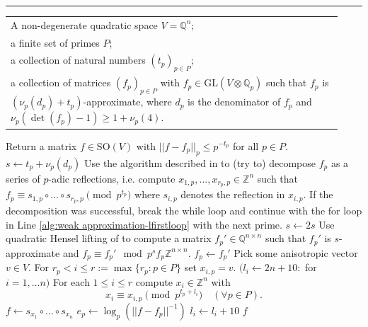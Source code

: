 \documentclass[11pt,letterpaper]{amsart}
\newcommand{\QQ}{\mathbb{Q}}
\newcommand{\ZZ}{\mathbb{Z}}
\theoremstyle{definition}
\theoremstyle{remark}
\begin{document}
\begingroup
{}\label{alg:weak approximation}
\endgroup
\hrule
\begin{algorithmic}[1]
\REQUIRE \begin{tabular}[t]{@{\textbullet\hspace{0.5em}} p{0.928\linewidth} @{}}
A non-degenerate quadratic space $V=\QQ^n$; \\
a finite set of primes $P$;\\
a collection of natural numbers $(t_p)_{p \in P}$;\\
a collection of matrices $(f_p)_{p \in P}$ with $f_p\in \mathrm{GL}(V \otimes \QQ_p)$ 
such that $f_p$ is $(\nu_p(d_p)+t_p)$-approximate, where $d_p$ is the denominator of $f_p$ and $\nu_p(\det(f_p)-1)\geq 1+\nu_p(4)$. 
\end{tabular}
\ENSURE Return a matrix $f \in \mathrm{SO}(V)$ with $||f - f_p||_p \leq p^{-t_p}$ for all $p \in P$.
\label{alg:weak approximation-lfirstloop}
  \STATE $s \gets t_p+\nu_p(d_p)$
  \STATE Use the algorithm described in \cite[Lemma 5.8]{shimada.connected.components} to (try to) decompose $f_p$ as a series of $p$-adic reflections, i.e. compute $x_{1,p},\dots ,x_{r_p,p} \in \ZZ^n$ such that $f_p \equiv s_{1,p} \circ \dots \circ s_{r_p,p} \pmod{ p^{t_p}}$ where $s_{i,p}$ denotes the reflection in $x_{i,p}$. \label{alg:weak approximation-lshimada} If the decomposition was successful, break the while loop and continue with the for loop in Line \ref{alg:weak approximation-lfirstloop} with the next prime. 
  \STATE $s \gets 2s$
  \STATE Use quadratic Hensel lifting of \cite[Algorithm 3]{brandhorst.veniani.hensel-lifting} to compute a matrix $f_p' \in \QQ^{n \times n}$ such that $f_p'$ is $s$-approximate and $f_p \equiv f_p' \mod p^s f_p \ZZ^{n \times n}$.  
  \STATE $f_p \gets f_p'$
  \ENDWHILE
\ENDFOR
\STATE Pick some anisotropic vector $v \in V$.
\STATE For $r_p<i\leq r:=\max\{r_p : p \in P\}$ set $x_{i,p}=v$. \label{alg:weak-approximation.padding}
\STATE $(l_i \gets 2n+10 \colon$  for $i = 1,\dots n)$
\REPEAT
    \STATE For each $1 \leq i \leq r$ compute $x_i \in \ZZ^n$ with \[x_i \equiv x_{i,p} \pmod{p^{t_p+l_i}} \quad ( \forall p \in P).\]
    \vspace*{-4mm}
    \STATE $f\gets s_{x_1} \circ \dots \circ s_{x_n}$
        \STATE $e_p \gets \log_p(||f - f_p||^{-1})$
        \STATE $l_i\gets l_i+10$
        \ENDIF
    \ENDFOR
{}
\RETURN $f$
\end{algorithmic}\hrulefill\\
\end{document}
